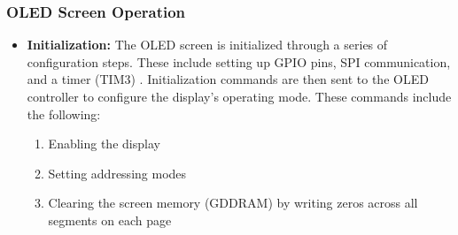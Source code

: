 \subsubsection{OLED Screen Operation}
\begin{itemize}
    \item \textbf{Initialization:} The OLED screen is initialized through a series of configuration steps. These include setting up GPIO pins, SPI communication, and a timer (TIM3) \cite{interfacex}. Initialization commands are then sent to the OLED controller to configure the display's operating mode. These commands include the following: 
    \begin{enumerate}
        \item Enabling the display
        \item Setting addressing modes
        \item Clearing the screen memory (GDDRAM) by writing zeros across all segments on each page
    \end{enumerate}


\end{itemize}
